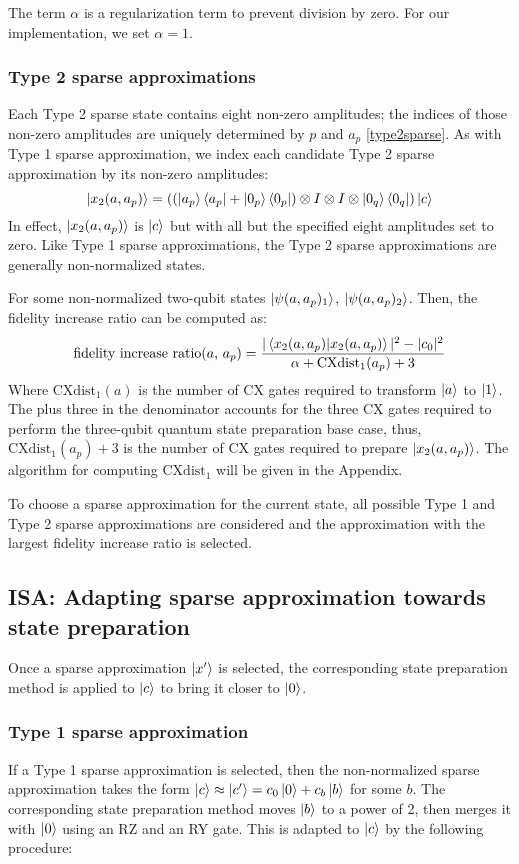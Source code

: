 \documentclass{article}
\begin{document}
The term $\alpha$ is a regularization term to prevent division by zero. For our
implementation, we set $\alpha = 1$.

\subsubsection{Type 2 sparse approximations}
Each Type 2 sparse state contains eight non-zero amplitudes; the indices of
those non-zero amplitudes are uniquely determined by $p$ and $a_p$ \ref{type2sparse}. As with Type 1 sparse approximation, we index each candidate 
Type 2 sparse approximation by its non-zero amplitudes:
$$\mathinner{|{x_2(a, a_p)}\rangle} = ((\mathinner{|{a_p}\rangle}\mathinner{\langle{a_p}|} + \mathinner{|{0_p}\rangle}\mathinner{\langle{0_p}|}) \otimes I \otimes I \otimes \mathinner{|{0_q}\rangle}\mathinner{\langle{0_q}|})\mathinner{|{c}\rangle}$$
In effect, $\mathinner{|{x_2(a, a_p)}\rangle}$ is $\mathinner{|{c}\rangle}$ but with all but the specified eight
amplitudes set to zero. Like Type 1 sparse approximations, the Type 2 sparse
approximations are generally non-normalized states.

For some non-normalized two-qubit states $\mathinner{|{\psi(a, a_p)_1}\rangle}$, 
$\mathinner{|{\psi(a, a_p)_2}\rangle}$. Then, the fidelity increase ratio can be computed as:
$$\text{fidelity increase ratio($a$, $a_p$)} = \frac{|\mathinner{\langle{x_2(a, a_p) | x_2(a, a_p)}\rangle}|^2 - |c_0|^2}{\alpha + \text{CXdist}_1(a_p) + 3}$$
Where $\text{CXdist}_1(a)$ is the number of CX gates required to transform
$\mathinner{|{a}\rangle}$ to $\mathinner{|{1}\rangle}$. The plus three in the denominator accounts for the 
three CX gates required to perform the three-qubit quantum state preparation
base case, thus, $\text{CXdist}_1(a_p) + 3$ is the number of CX gates required
to prepare $\mathinner{|{x_2(a, a_p)}\rangle}$. The algorithm for computing $\text{CXdist}_1$
will be given in the Appendix.

To choose a sparse approximation for the current state, all possible Type 1 and
Type 2 sparse approximations are considered and the approximation with the
largest fidelity increase ratio is selected.

\subsection{ISA: Adapting sparse approximation towards state preparation}
Once a sparse approximation $\mathinner{|{x'}\rangle}$ is selected, the corresponding state 
preparation method is applied to $\mathinner{|{c}\rangle}$ to bring it closer to $\mathinner{|{0}\rangle}$.
\subsubsection{Type 1 sparse approximation}
If a Type 1 sparse approximation is selected, then the non-normalized sparse 
approximation takes the form
$\mathinner{|{c}\rangle} \approx \mathinner{|{c'}\rangle} = c_0\mathinner{|{0}\rangle} + c_b\mathinner{|{b}\rangle}$
for some $b$. The corresponding state preparation method moves $\mathinner{|{b}\rangle}$ to a 
power of 2, then merges it with $\mathinner{|{0}\rangle}$ using an RZ and an RY
gate. This is adapted to $\mathinner{|{c}\rangle}$ by the following procedure:
\end{document}
